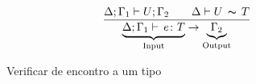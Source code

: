 \begin{figure}[h!]
  \begin{gather*}
    \frac{\Delta;\Gamma_1 \vdash U;\Gamma_2 \qquad \Delta \vdash U\,\thicksim\,T}
         {\underbrace{\Delta;\Gamma_1 \vdash \, e \colon T}_{\text{Input}} \rightarrow \underbrace{\Gamma_2}_{\text{Output}}}
  \end{gather*}
  \caption{Verificar de encontro a um tipo}
  \label{fig:check-against}
\end{figure}


